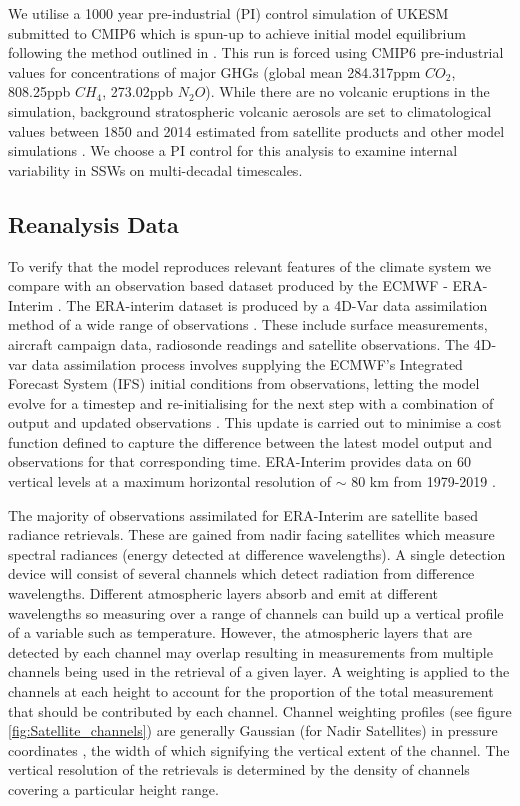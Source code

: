 We utilise a 1000 year pre-industrial (PI) control simulation of UKESM submitted to CMIP6 which is spun-up to achieve initial model equilibrium following the method outlined in \cite{yoolSpinup2020b}. This run is forced using CMIP6 pre-industrial values for concentrations of major GHGs (global mean 284.317ppm $CO_2$, 808.25ppb $CH_4$, 273.02ppb $N_2O$). While there are no volcanic eruptions in the simulation, background stratospheric volcanic aerosols are set to climatological values between 1850 and 2014 estimated from satellite products and other model simulations \citep{menaryPreindustrial2018b}. We choose a PI control for this analysis to examine internal variability in SSWs on multi-decadal timescales. 


\subsection{Reanalysis Data}
\label{sec:ERA_data}
To verify that the model reproduces relevant features of the climate system we compare with an observation based dataset produced by the ECMWF - ERA-Interim \cite{Dee2011}. The ERA-interim dataset is produced by a 4D-Var data assimilation method of a wide range of observations \citep{Uppala2005}. These include surface measurements, aircraft campaign data, radiosonde readings and satellite observations. The 4D-var data assimilation process involves supplying the ECMWF’s Integrated Forecast System (IFS) initial conditions from observations, letting the model evolve for a timestep and re-initialising for the next step with a combination of output and updated observations \citep{courtierECMWF1998, bouttierObservingsystem2001a}. This update is carried out to minimise a cost function defined to capture the difference between the latest model output and observations for that corresponding time. ERA-Interim provides data on 60 vertical levels at a maximum horizontal resolution of $\sim$ 80 km from 1979-2019 \citep{Berrisford}.

The majority of observations assimilated for ERA-Interim are satellite based radiance retrievals. These are gained from nadir facing satellites which measure spectral radiances (energy detected at difference wavelengths). A single detection device will consist of several channels which detect radiation from difference wavelengths. Different atmospheric layers absorb and emit at different wavelengths so measuring over a range of channels can build up a vertical profile of a variable such as temperature. However, the atmospheric layers that are detected by each channel may overlap resulting in measurements from multiple channels being used in the retrieval of a given layer. A weighting is applied to the channels at each height to account for the proportion of the total measurement that should be contributed by each channel. Channel weighting profiles (see figure \ref{fig:Satellite_channels}) are generally Gaussian (for Nadir Satellites) in pressure coordinates \citep{fujiwaraIntroduction2017}, the width of which signifying the vertical extent of the channel. The vertical resolution of the retrievals is determined by the density of channels covering a particular height range. 

